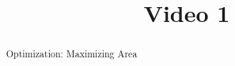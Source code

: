 \documentclass[handout]{ximera}
\title{Video 1}
\begin{document}
\begin{abstract}
Optimization: Maximizing Area
\end{abstract}

\maketitle

\end{document}
